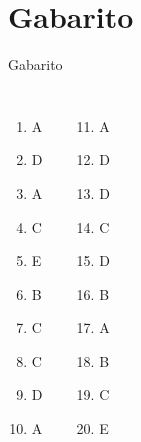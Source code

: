 \documentclass[11pt]{beamer}
\begin{document}
\section{Gabarito}

\begin{frame}{Gabarito}
    \begin{columns}

    \begin{enumerate}
      \item A
      \item D
      \item A
      \item C
      \item E
      \item B
      \item C
      \item C
      \item D
      \item A
    \end{enumerate}

    \begin{enumerate}
      \setcounter{enumi}{10}
      \item A
      \item D
      \item D
      \item C
      \item D
      \item B
      \item A
      \item B
      \item C
      \item E
   
    \end{enumerate}

  \end{columns}
\end{frame}
\end{document}
